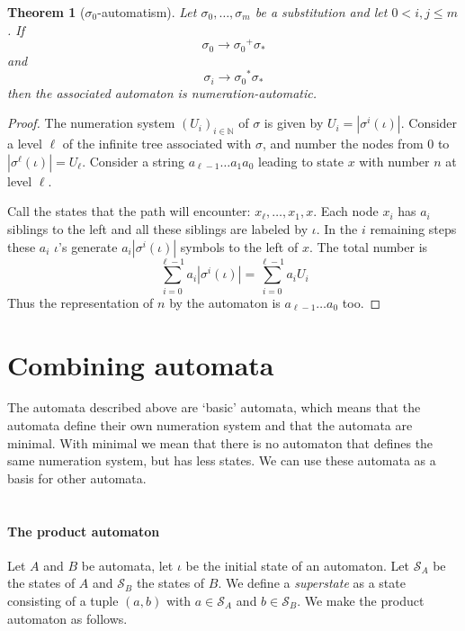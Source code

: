 \documentclass{article}
\newtheorem{theorem}{Theorem}[subsection]
\theoremstyle{definition}
\begin{document}
\begin{theorem}[$\sigma_0$-automatism] \label{thm:semiaut}
Let $\sigma_0, \ldots, \sigma_m$ be a substitution and let $0 < i, j \le m$. If
\begin{displaymath}
\sigma_0 \rightarrow {\sigma_0}^+ \sigma_*
\end{displaymath}
and
\begin{displaymath}
\sigma_i \rightarrow {\sigma_0}^* \sigma_*
\end{displaymath}
then the associated automaton is numeration-automatic.
\end{theorem}
\begin{proof}
The numeration system $(U_i)_{i \in \mathbb{N}}$ of $\sigma$ is given by
$U_i = |\sigma^i(\iota)|$. 
Consider a level $\ell$ of the infinite tree associated with $\sigma$, and 
number the nodes from 0 to $|\sigma^\ell(\iota)| = U_\ell$.
Consider a string $a_{\ell - 1} \ldots a_1 a_0$ leading to state $x$ with 
number $n$ at level $\ell$.

Call the states that the path will encounter: $x_\ell, \ldots, x_1, x$. 
Each node $x_i$ has $a_i$ siblings to the left and all these siblings are
labeled by $\iota$. In the $i$ remaining steps these $a_i$ $\iota$'s generate
$a_i |\sigma^i(\iota)|$ symbols to the left of $x$. The total number is 
\begin{displaymath}
\sum_{i = 0}^{\ell - 1} a_i |\sigma^i(\iota)| = \sum_{i = 0}^{\ell - 1} a_i U_i
\end{displaymath}
Thus the representation of $n$ by the automaton is $a_{\ell - 1} \ldots a_0$
too.
\end{proof}

\section{Combining automata}
The automata described above are `basic' automata, which means that the 
automata define their own numeration system and that the automata are minimal.
With minimal we mean that there is no automaton that defines the same 
numeration system, but has less states.
We can use these automata as a basis for other automata.\\
\\
\paragraph{The product automaton}
Let $A$ and $B$ be automata, let $\iota$ be the initial state of an automaton.
Let $\mathcal{S}_A$ be the states of $A$ and $\mathcal{S}_B$ the states of $B$.
We define a \emph{superstate} as a state consisting of a tuple $(a, b)$ with
$a \in \mathcal{S}_A$ and $b \in \mathcal{S}_B$. We make the product automaton
as follows.
\end{document}
